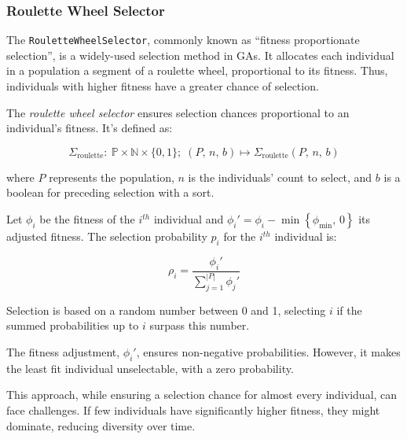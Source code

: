 \subsubsection{Roulette Wheel Selector}
\label{sec:keen:op:select:roulette}
  The \texttt{RouletteWheelSelector}, commonly known as \enquote{fitness 
  proportionate selection}, is a widely-used selection method in GAs.
  It allocates each individual in a population a segment of a roulette wheel, 
  proportional to its fitness.
  Thus, individuals with higher fitness have a greater chance of selection.

  \begin{definition}
    The \emph{roulette wheel selector} ensures selection chances proportional to 
    an individual's fitness.
    It's defined as:

    \begin{equation}
      \Sigma_\mathrm{roulette} :\: 
        \mathbb{P} \times \mathbb{N} \times \{0, 1\};\;
      (P,\, n,\, b) \mapsto \Sigma_\mathrm{roulette}(P,\, n,\, b)
    \end{equation}

    where \(P\) represents the population, \(n\) is the individuals' count to 
    select, and \(b\) is a boolean for preceding selection with a sort.

    Let \(\phi_i\) be the fitness of the \(i^{th}\) individual and \(\phi_i' =  
    \phi_i - \min\left\{\phi_\mathrm{min},\, 0\right\}\) its adjusted fitness. 
    The selection probability \(p_i\) for the \(i^{th}\) individual is:

    \begin{equation}
      \rho_i = \frac{\phi_i'}{\sum_{j=1}^{|P|} \phi_j'}
    \end{equation}

    Selection is based on a random number between 0 and 1, selecting \(i\) if 
    the summed probabilities up to \(i\) surpass this number.
  \end{definition}

  \begin{remark}
    The fitness adjustment, \(\phi_i'\), ensures non-negative probabilities. 
    However, it makes the least fit individual unselectable, with a zero 
    probability.
  \end{remark}

  This approach, while ensuring a selection chance for almost every individual, 
  can face challenges.
  If few individuals have significantly higher fitness, they might dominate, 
  reducing diversity over time.
